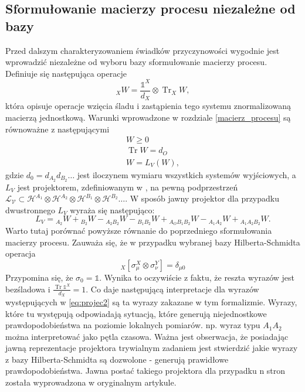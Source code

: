 \documentclass[10pt]{article} %
\DeclareMathOperator{\Trs}{Tr}
\newcommand{\Hx}[1]{\mathcal{H}^{#1}}
\newcommand{\I}{\mathbb{1}}
\begin{document}
\subsection{Sformułowanie macierzy procesu niezależne od bazy}
Przed dalszym charakteryzowaniem świadków przyczynowości wygodnie jest wprowadzić niezależne od wyboru bazy sformułowanie macierzy procesu.
Definiuje się następująca operacje
\begin{equation}
{}_X W = \frac{\I^X}{d_X} \otimes \Trs_X W,
\end{equation}
która opisuje operacje wzięcia śladu i zastąpienia tego systemu znormalizowaną macierzą jednostkową.
Warunki wprowadzone w rozdziale \ref{macierz_procesu} są równoważne z następującymi
\begin{gather}
W \geq 0 \\
\Trs W = d_O \\
W = L_V\left(W\right),
\end{gather}
gdzie $d_0 = d_{A_2} d_{B_2} \dots$ jest iloczynem wymiaru wszystkich systemów wyjściowych, a $L_V$ jest projektorem, zdefiniowanym w \cite{causal_witness}, na pewną podprzestrzeń 
$\mathcal{L_V} \subset \Hx{A_1} \otimes \Hx{A_2} \otimes \Hx{B_1} \otimes \Hx{B_2} \dots$.
W sposób jawny projektor dla przypadku dwustronnego $L_V$ wyraża się następująco:
\begin{equation}
\label{eq:projec2}
L_V = {}_{A_2}W + {}_{B_2}W - {}_{A_2B_2}W - {}_{B_1B_2}W + {}_{A_OB_1B_2}W - {}_{A_1A_2}W + {}_{A_1A_2B_2}W.
\end{equation}
Warto tutaj porównać powyższe równanie do poprzedniego sformułowania macierzy procesu. Zauważa się, że w przypadku wybranej bazy Hilberta-Schmidta
operacja
\begin{equation}
{}_X\left[\sigma_\mu^X \otimes \sigma_\nu^Y\right] = \delta_{\mu0}
\end{equation}
Przypomina się, że $\sigma_0 = \I$.
Wynika to oczywiście z faktu, że reszta wyrazów jest bezśladowa i $\frac{\Trs \I^X}{d_X} = 1$. Co daje następującą interpretacje dla wyrazów występujących w \eqref{eq:projec2} są ta wyrazy zakazane w tym formalizmie. Wyrazy, które tu występują odpowiadają sytuacją, które generują niejednostkowe prawdopodobieństwa na poziomie lokalnych pomiarów. np. wyraz typu $A_1A_2$ można interpretować jako pętla czasowa. Ważna jest obserwacja, że posiadając jawną reprezentacje projektora trywialnym zadaniem jest stwierdzić jakie wyrazy z bazy Hilberta-Schmidta są dozwolone - generują prawidłowe prawdopodobieństwa. Jawna postać takiego projektora dla przypadku n stron została wyprowadzona w oryginalnym artykule.
\end{document}
